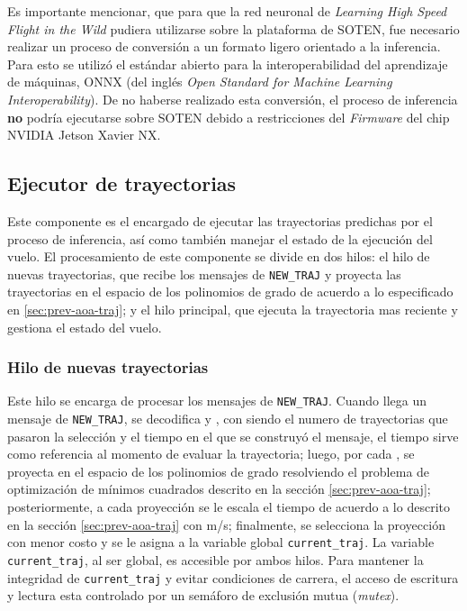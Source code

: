 Es importante mencionar, que para que la red neuronal de \textit{Learning High Speed Flight in the Wild} \cite{Loquercio2021} pudiera utilizarse sobre la plataforma de SOTEN, fue necesario realizar un proceso de conversión a un formato ligero orientado a la inferencia. Para esto se utilizó el estándar abierto para la interoperabilidad del aprendizaje de máquinas, ONNX \cite{onnx} (del inglés \textit{Open Standard for Machine Learning Interoperability}). De no haberse realizado esta conversión, el proceso de inferencia \textbf{no} podría ejecutarse sobre SOTEN debido a restricciones del \textit{Firmware} del chip NVIDIA Jetson Xavier NX.

\subsection{Ejecutor de trayectorias}

Este componente es el encargado de ejecutar las trayectorias predichas por el proceso de inferencia, así como también manejar el estado de la ejecución del vuelo. El procesamiento de este componente se divide en dos hilos: el hilo de nuevas trayectorias, que recibe los mensajes de \texttt{NEW\_TRAJ} y proyecta las trayectorias en el espacio de los polinomios de grado  de acuerdo a lo especificado en \ref{sec:prev-aoa-traj}; y el hilo principal, que ejecuta la trayectoria mas reciente y gestiona el estado del vuelo.

\subsubsection{Hilo de nuevas trayectorias}

Este hilo se encarga de procesar los mensajes de \texttt{NEW\_TRAJ}. Cuando llega un mensaje de \texttt{NEW\_TRAJ}, se decodifica  y , con \jim{\beta} siendo el numero de trayectorias que pasaron la selección  y  el tiempo en el que se construyó el mensaje, el tiempo  sirve como referencia al momento de evaluar la trayectoria; luego, por cada , se proyecta  en el espacio de los polinomios de grado  resolviendo el problema de optimización de mínimos cuadrados descrito en la sección \ref{sec:prev-aoa-traj}; posteriormente, a cada proyección  se le escala el tiempo  de acuerdo a lo descrito en la sección \ref{sec:prev-aoa-traj} con  m/s; finalmente, se selecciona la proyección con menor costo  y se le asigna a la variable global \texttt{current\_traj}. La variable \texttt{current\_traj}, al ser global, es accesible por ambos hilos. Para mantener la integridad de \texttt{current\_traj} y evitar condiciones de carrera,  el acceso de escritura y lectura esta controlado por un semáforo de exclusión mutua (\textit{mutex}).

